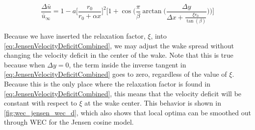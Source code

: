 \documentclass{jpconf}
\begin{document}
\begin{equation}
	\frac{\Delta \bar{u}}{\bar{u}_\infty} = 1 - a \bigg[\frac{r_0}{r_0 + \alpha x} \bigg]^2 \Bigg[1 + \cos{\Bigg(\frac{\pi}{\beta} \arctan{\Bigg(\frac{\Delta y}{\Delta x + \frac{\xi r_0}{\tan(\beta)}}} \Bigg) \Bigg)} \Bigg]
	\label{eq:JensenVelocityDeficitCombined}
\end{equation}

Because we have inserted the relaxation factor, $\xi$, into \cref{eq:JensenVelocityDeficitCombined}, we may adjust the wake spread without changing the velocity deficit in the center of the wake. Note that this is true because when $\Delta y = 0$, the term inside the inverse tangent in \cref{eq:JensenVelocityDeficitCombined} goes to zero, regardless of the value of $\xi$. Because this is the only place where the relaxation factor is found in \cref{eq:JensenVelocityDeficitCombined}, this means that the velocity deficit will be constant with respect to $\xi$ at the wake center. This behavior is shown in \cref{fig:wec_jensen_wec_d}, which also shows that local optima can be smoothed out through WEC for the Jensen cosine model.

\end{document}

